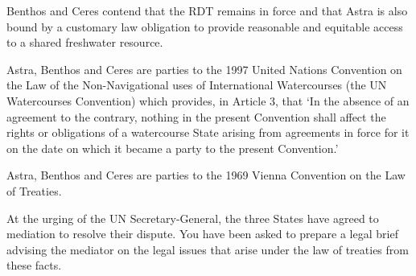 \begin{tutorialquestion}
    \vspace{\baselineskip}

    Benthos and Ceres contend that the RDT remains in force and that Astra is also bound by a customary law obligation to provide reasonable and equitable access to a shared freshwater resource.

    \vspace{\baselineskip}

    Astra, Benthos and Ceres are parties to the 1997 United Nations Convention on the Law of the Non-Navigational uses of International Watercourses (the UN Watercourses Convention) which provides, in Article 3, that `In the absence of an agreement to the contrary, nothing in the present Convention shall affect the rights or obligations of a watercourse State arising from agreements in force for it on the date on which it became a party to the present Convention.'

    \vspace{\baselineskip}

    Astra, Benthos and Ceres are parties to the 1969 Vienna Convention on the Law of Treaties.

    \vspace{\baselineskip}

    At the urging of the UN Secretary-General, the three States have agreed to mediation to resolve their dispute. You have been asked to prepare a legal brief advising the mediator on the legal issues that arise under the law of treaties from these facts.

\end{tutorialquestion}


